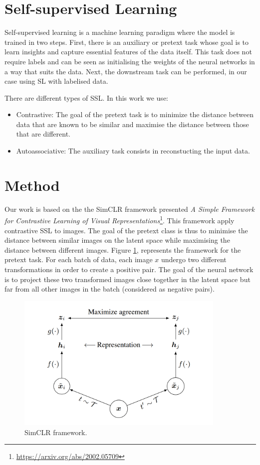 \documentclass{article}
\begin{document}
\section{Self-supervised Learning}
Self-supervised learning is a machine learning paradigm where the model is trained in two steps. First, there is an auxiliary or pretext task whose goal is to learn insights and capture essential features of the data itself. This task does not require labels and can be seen as initialising the weights of the neural networks in a way that suits the data. Next, the downstream task can be performed, in our case using SL with labelised data.

There are different types of SSL. In this work we use:
\begin{itemize}
    \item Contrastive: The goal of the pretext task is to minimize the distance between data that are known to be similar and maximise the distance between those that are different.
    \item Autoassociative: The auxiliary task consists in reconstucting the input data.
\end{itemize}

\section{Method}
Our work is based on the the SimCLR framework presented \textit{A Simple Framework for Contrastive Learning of Visual Representations}\footnote{\url{https://arxiv.org/abs/2002.05709}}. This framework apply contrastive SSL to images. The goal of the pretext class is thus to minimise the distance between similar images on the latent space while maximising the distance between different images. Figure \ref{simclr}, represents the framework for the pretext task. For each batch of data, each image \(x\) undergo two different transformations in order to create a positive pair. The goal of the neural network is to project these two transformed images close together in the latent space but far from all other images in the batch (considered as negative pairs).

\begin{figure}[]
    \centering
    \includegraphics[width=10cm]{img/simclr.png}
    \caption{SimCLR framework.}
    \label{simclr}
\end{figure}
\end{document}

